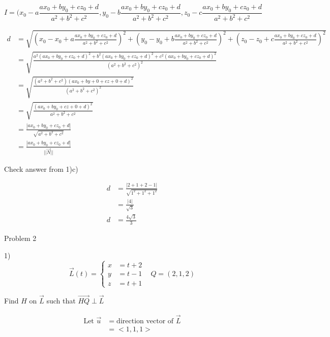 \documentclass{article}
\begin{document}
$$
I = (x_0-a\frac{ax_0 + by_0 + cz_0 + d}{a^2 + b^2 + c^2}, y_0-b\frac{ax_0 + by_0 + cz_0 + d}{a^2 + b^2 + c^2}, z_0-c\frac{ax_0 + by_0 + cz_0 + d}{a^2 + b^2 + c^2}
$$

\begin{align*}
d &= \sqrt{(x_0 - x_0 + a\frac{ax_0 + by_0 + cz_0 + d}{a^2 + b^2 + c^2})^2 + (y_0 - y_0 + b\frac{ax_0 + by_0 + cz_0 + d}{a^2 + b^2 + c^2})^2 + (z_0 - z_0 + c\frac{ax_0 + by_0 + cz_0 + d}{a^2 + b^2 + c^2})^2} \\
&= \sqrt{\frac{a^2(ax_0+by_0+cz_0+d)^2 + b^2(ax_0+by_0+cz_0+d)^2 + c^2(ax_0+by_0+cz_0+d)^2}{(a^2 + b^2 + c^2)^2}} \\
&= \sqrt{\frac{(a^2 + b^2 + c^2)(ax_0+by+0+cz+0+d)^2}{(a^2 + b^2 + c^2)^2}} \\
&= \sqrt{\frac{(ax_0 + by_0 + cz+0 +d)^2}{a^2 + b^2 + c^2}} \\
&= \frac{|ax_0 + by_0 + cz_0 + d|}{\sqrt{a^2+b^2+c^2}} \\
&= \frac{|ax_0 + by_0 + cz_0 + d|}{||\vec{N}||}
\end{align*}

\begin{text}
\newline
Check answer from 1)c)
\end{text}

\begin{align*}
d &= \frac{| 2 + 1 + 2 - 1 |}{\sqrt{1^2 + 1^2 + 1^2}} \\
&= \frac{| 4 |}{\sqrt{3}} \\
d &= \frac{4\sqrt{3}}{3}
\end{align*}



\begin{text}
Problem 2
\end{text}

1)
\[\vec{L}(t) = \left\{
  \begin{array}{lr}
    x &= t + 2 \\
    y &= t - 1 \\
    z &= t + 1
  \end{array}
\right.
\;\;\;
Q = (2,1,2)
\]

\begin{text}
Find $H$ on $\vec{L}$ such that $\vec{HQ} \perp \vec{L}$ \\
\end{text}

\begin{align*}
\text{Let } \vec{u} &= \text{direction vector of } \vec{L} \\
&= <1,1,1>
\end{align*}
\end{document}
